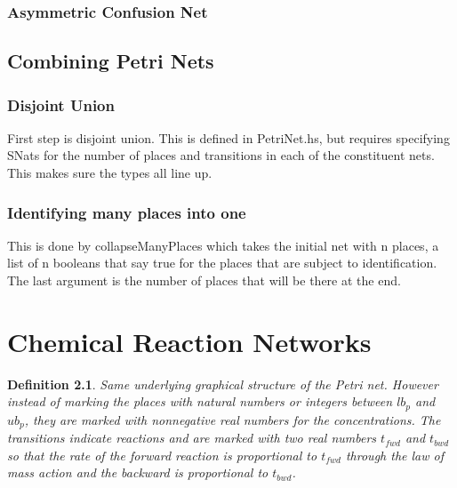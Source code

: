 \documentclass[11pt]{book}
\theoremstyle{change}
\newtheorem{definition}[equation]{Definition}
\theoremstyle{nonumberplain}
\numberwithin{equation}{section}
\begin{document}
\subsection{Asymmetric Confusion Net}

\section{Combining Petri Nets}

\subsection{Disjoint Union}

First step is disjoint union. This is defined in PetriNet.hs, but requires specifying SNats for the number of places and transitions in each of the constituent nets. This makes sure the types all line up.

\subsection{Identifying many places into one}

This is done by collapseManyPlaces which takes the initial net with n places, a list of n booleans that say true for the places that are subject to identification. The last argument is the number of places that will be there at the end.

\chapter{Chemical Reaction Networks}

\begin{definition}
Same underlying graphical structure of the Petri net. However instead of marking the places with natural numbers or integers between $lb_p$ and $ub_p$, they are marked with nonnegative real numbers for the concentrations. The transitions indicate reactions and are marked with two real numbers $t_{fwd}$ and $t_{bwd}$ so that the rate of the forward reaction is proportional to $t_{fwd}$ through the law of mass action and the backward is proportional to $t_{bwd}$.
\end{definition}
\end{document}
